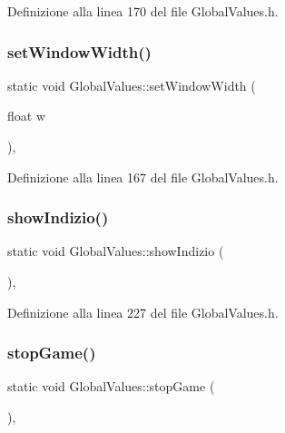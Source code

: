 Definizione alla linea 170 del file Global\+Values.\+h.

\mbox{\label{class_global_values_abb35dfba6d3c15563308a76186e0cce1}} 
\subsubsection{\texorpdfstring{set\+Window\+Width()}{setWindowWidth()}}
{\footnotesize\ttfamily static void Global\+Values\+::set\+Window\+Width (\begin{DoxyParamCaption}\item[{float}]{w }\end{DoxyParamCaption})\hspace{0.3cm}{\ttfamily [inline]}, {\ttfamily [static]}}



Definizione alla linea 167 del file Global\+Values.\+h.

\mbox{\label{class_global_values_a783f8c7c90b16f968a81f5bac4146959}} 
\subsubsection{\texorpdfstring{show\+Indizio()}{showIndizio()}}
{\footnotesize\ttfamily static void Global\+Values\+::show\+Indizio (\begin{DoxyParamCaption}{ }\end{DoxyParamCaption})\hspace{0.3cm}{\ttfamily [inline]}, {\ttfamily [static]}}



Definizione alla linea 227 del file Global\+Values.\+h.

\mbox{\label{class_global_values_aef6c1bb1b8314d3c0a24cf3195fdf79a}} 
\subsubsection{\texorpdfstring{stop\+Game()}{stopGame()}}
{\footnotesize\ttfamily static void Global\+Values\+::stop\+Game (\begin{DoxyParamCaption}{ }\end{DoxyParamCaption})\hspace{0.3cm}{\ttfamily [inline]}, {\ttfamily [static]}}



